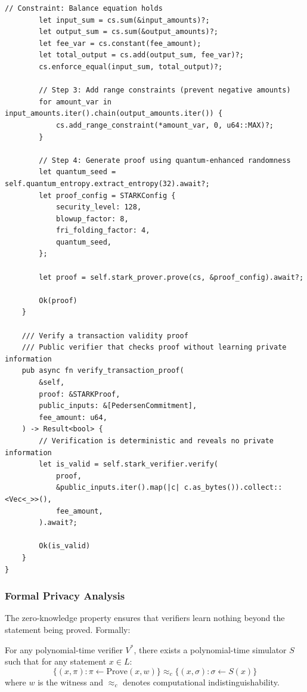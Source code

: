 \documentclass[11pt,a4paper]{article}
\begin{document}
\begin{lstlisting}[caption=ZK-STARK Balance Proof Generation]
        // Constraint: Balance equation holds
        let input_sum = cs.sum(&input_amounts)?;
        let output_sum = cs.sum(&output_amounts)?;
        let fee_var = cs.constant(fee_amount);
        let total_output = cs.add(output_sum, fee_var)?;
        cs.enforce_equal(input_sum, total_output)?;
        
        // Step 3: Add range constraints (prevent negative amounts)
        for amount_var in input_amounts.iter().chain(output_amounts.iter()) {
            cs.add_range_constraint(*amount_var, 0, u64::MAX)?;
        }
        
        // Step 4: Generate proof using quantum-enhanced randomness
        let quantum_seed = self.quantum_entropy.extract_entropy(32).await?;
        let proof_config = STARKConfig {
            security_level: 128,
            blowup_factor: 8,
            fri_folding_factor: 4,
            quantum_seed,
        };
        
        let proof = self.stark_prover.prove(cs, &proof_config).await?;
        
        Ok(proof)
    }
    
    /// Verify a transaction validity proof
    /// Public verifier that checks proof without learning private information
    pub async fn verify_transaction_proof(
        &self,
        proof: &STARKProof,
        public_inputs: &[PedersenCommitment],
        fee_amount: u64,
    ) -> Result<bool> {
        // Verification is deterministic and reveals no private information
        let is_valid = self.stark_verifier.verify(
            proof,
            &public_inputs.iter().map(|c| c.as_bytes()).collect::<Vec<_>>(),
            fee_amount,
        ).await?;
        
        Ok(is_valid)
    }
}
\end{lstlisting}

\subsubsection{Formal Privacy Analysis}

The zero-knowledge property ensures that verifiers learn nothing beyond the statement being proved. Formally:

\begin{theorem}
For any polynomial-time verifier $V^*$, there exists a polynomial-time simulator $S$ such that for any statement $x \in L$:
$$\{(x, \pi) : \pi \leftarrow \text{Prove}(x, w)\} \approx_c \{(x, \sigma) : \sigma \leftarrow S(x)\}$$
where $w$ is the witness and $\approx_c$ denotes computational indistinguishability.
\end{theorem}
\end{document}
